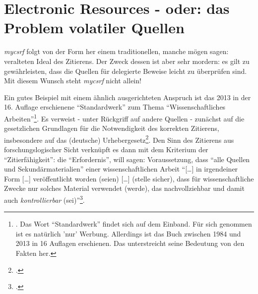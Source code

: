 %
%
%
%
\section{Electronic Resources - oder: das Problem volatiler Quellen}

\emph{mycsrf} folgt von der Form her einem traditionellen, manche mögen sagen:
veralteten Ideal des Zitierens. Der Zweck dessen ist aber sehr mordern: es gilt
zu gewährleisten, dass die Quellen für delegierte Beweise leicht zu überprüfen
sind. Mit diesem Wunsch steht \emph{mycsrf} nicht allein!

Ein gutes Beispiel mit einem ähnlich ausgerichteten Anspruch ist das 2013
in der 16. Auflage erschienene \enquote{Standardwerk} zum Thema
\enquote{Wissenschaftliches
Arbeiten}\footnote{\cite[vgl.][\nopage]{Theisen2013a}. Das Wort
\enquote{Standardwerk} findet sich auf dem Einband. Für sich genommen ist es
natürlich 'nur'  Werbung. Allerdings ist das Buch zwischen 1984 und 2013 in 16
Auflagen erschienen. Das unterstreicht seine Bedeutung von den Fakten her.}.
Es verweist - unter Rückgriff auf andere Quellen - zunächst auf die gesetzlichen
Grundlagen für die Notwendigkeit des korrekten Zitierens, insbesondere auf das
(deutsche) Urhebergesetz\footcite[vgl.][159]{Theisen2013a}. Den Sinn des
Zitierens aus forschungslogischer Sicht verknüpft es dann mit dem Kriterium der
\enquote{Zitierfähigkeit}: die \enquote{Erfordernis}, will sagen:
Voraussetzung, dass \enquote{alle Quellen und Sekundärmaterialien} einer
wissenschaftlichen Arbeit \enquote{[\ldots] in irgendeiner Form [\ldots]
veröffentlicht worden (seien) [\ldots] (stelle sicher), dass für
wissenschaftliche Zwecke nur solches Material verwendet (werde), das
nachvollziehbar und damit auch \emph{kontrollierbar} (sei)}\footcite[vgl.][160;
herv. i.O]{Theisen2013a}.

